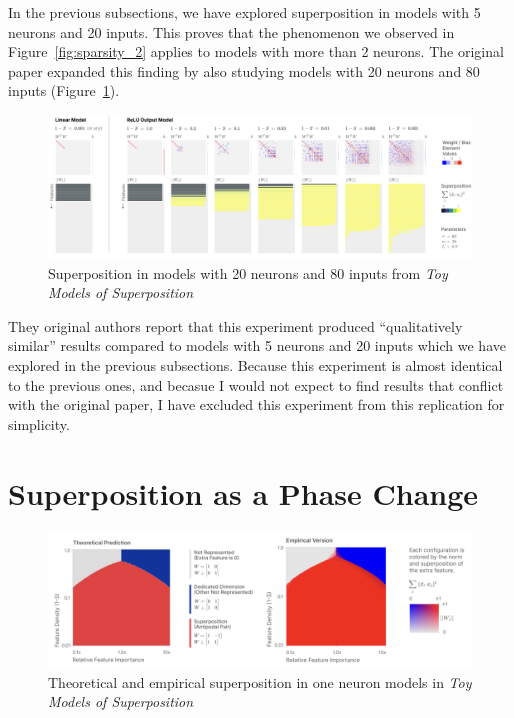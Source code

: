 \documentclass{article} %
\begin{document}
In the previous subsections, we have explored superposition in models with 5
neurons and 20 inputs. This proves that the phenomenon we observed in Figure~\ref{fig:sparsity_2}
applies to models with more than 2 neurons. The original paper expanded this 
finding by also studying models with 20 neurons and 80 inputs (Figure~\ref{fig:section3_anthropic2}). \\

\begin{figure}[h]
    \centering
    \includegraphics[width=0.99\linewidth]{demonstrating_superposition/images/anthropic_section3_part2.png}
    \captionsetup{font=footnotesize, width=0.7\linewidth} %
    \caption{
        Superposition in models with 20 neurons and 80 inputs from \textit{Toy Models of Superposition}\cite{elhage2022toy}
    }
    \label{fig:section3_anthropic2}
\end{figure}

They original authors report that this experiment produced ``qualitatively similar''
results compared to models with 5 neurons and 20 inputs which we have explored
in the previous subsections. Because this experiment is almost identical to the
previous ones, and becasue I would not expect to find results that conflict
with the original paper, I have excluded this experiment from this replication
for simplicity.

\section{Superposition as a Phase Change}

\begin{figure}[h]
    \centering
    \includegraphics[width=0.99\linewidth]{phase_changes/images/phase_changes_anthropic.png}
    \captionsetup{font=footnotesize, width=0.7\linewidth} %
    \caption{
        Theoretical and empirical superposition in one neuron models in 
        \textit{Toy Models of Superposition}\cite{elhage2022toy}
    }
    \label{fig:section4_anthropic}
\end{figure}




\end{document}
